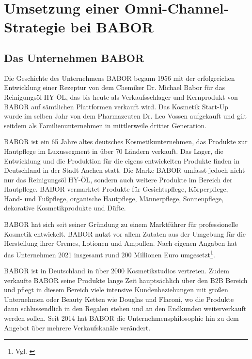 \newpage
\section{Umsetzung einer Omni-Channel-Strategie bei BABOR}\label{hauptabschnitt_4}

\subsection{Das Unternehmen BABOR}\label{unterabschnitt_4_1}

Die Geschichte des Unternehmens BABOR begann 1956 mit der erfolgreichen Entwicklung einer Rezeptur von dem Chemiker Dr. Michael Babor für das Reinigungsöl HY-ÖL, das bis heute als Verkaufsschlager und Kernprodukt von BABOR auf sämtlichen Plattformen verkauft wird. Das Kosmetik Start-Up wurde im selben Jahr von dem Pharmazeuten Dr. Leo Vossen aufgekauft und gilt seitdem als Familienunternehmen in mittlerweile dritter Generation.
\newline

BABOR ist ein 65 Jahre altes deutsches Kosmetikunternehmen, das Produkte zur Hautpflege im Luxussegment in über 70 Ländern verkauft. Das Lager, die Entwicklung und die Produktion für die eigens entwickelten Produkte finden in Deutschland in der Stadt Aachen statt. Die Marke BABOR umfasst jedoch nicht nur das Reinigungsöl HY-ÖL, sondern auch weitere Produkte im Bereich der Hautpflege. BABOR vermarktet Produkte für Gesichtspflege, Körperpflege, Hand- und Fußpflege, organische Hautpflege, Männerpflege, Sonnenpflege, dekorative Kosmetikprodukte und Düfte.
\newline

BABOR hat sich seit seiner Gründung zu einem Marktführer für professionelle Kosmetik entwickelt. BABOR nutzt vor allem Zutaten aus der Umgebung für die Herstellung ihrer Cremes, Lotionen und Ampullen. Nach eigenen Angaben hat das Unternehmen 2021 insgesamt rund 200 Millionen Euro umgesetzt\footnote{ Vgl. \autocite [online] {Finance2021}}.
\newline

BABOR ist in Deutschland in über 2000 Kosmetikstudios vertreten. Zudem verkaufte BABOR seine Produkte lange Zeit hauptsächlich über den B2B Bereich und pflegt in diesem Bereich viele intensive Kundenbeziehungen mit großen Unternehmen oder Beauty Ketten wie Douglas und Flaconi, wo die Produkte dann schlussendlich in den Regalen stehen und an den Endkunden weiterverkauft werden sollen. Seit 2014 hat BABOR die Unternehmensphilosophie hin zu dem Angebot über mehrere Verkaufskanäle verändert.

